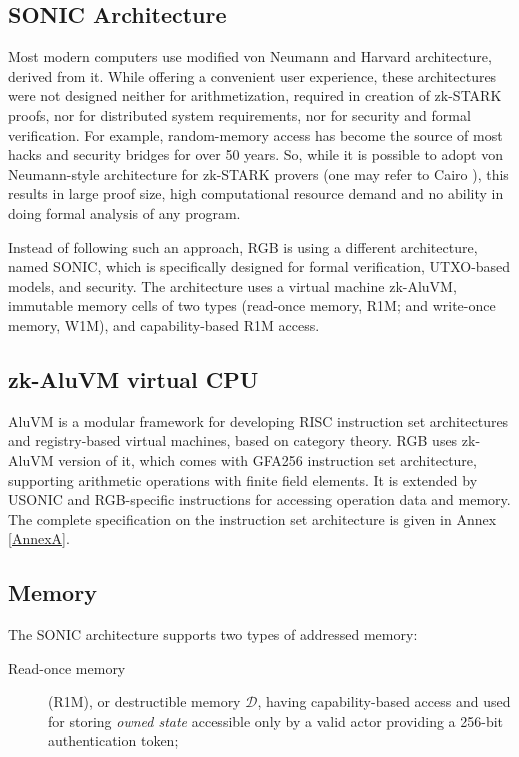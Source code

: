\documentclass[a4paper]{article}
\begin{document}
\begin{multicols}{2}

\section{SONIC Architecture}

Most modern computers use modified von Neumann and Harvard architecture, derived from it.
While offering a convenient user experience, these architectures were not designed neither for
arithmetization, required in creation of zk-STARK proofs, nor for distributed system requirements,
nor for security and formal verification. For example, random-memory access has become the source
of most hacks and security bridges for over 50 years.
So, while it is possible to adopt von Neumann-style architecture for zk-STARK provers
(one may refer to Cairo \cite{Cairo}), this results in large proof size, high computational resource demand
and no ability in doing formal analysis of any program.

Instead of following such an approach, RGB is using a different architecture, named SONIC,
which is specifically designed for formal verification, UTXO-based models, and security.
The architecture uses a virtual machine zk-AluVM, immutable memory cells of two types
(read-once memory, R1M; and write-once memory, W1M), and capability-based R1M access.

\subsection{zk-AluVM virtual CPU}\label{AluVM}

AluVM \cite{AluVM} is a modular framework for developing RISC instruction set architectures and registry-based
virtual machines, based on category theory. RGB uses zk-AluVM version of it, 
which comes with GFA256 instruction set architecture, supporting arithmetic operations with
finite field elements. It is extended by USONIC and RGB-specific instructions
for accessing operation data and memory.
The complete specification on the instruction set architecture is given in Annex \ref{AnnexA}.

\subsection{Memory}\label{Memory}

The SONIC architecture supports two types of addressed memory:
\begin{description}
    \item[Read-once memory] (R1M), or \gls{destructible memory} $\mathcal{D}$, having capability-based access
    and used for storing \emph{owned state} accessible only by a valid actor providing a 256-bit
    \gls{authentication token};


\end{description}
\end{multicols}
\end{document}
